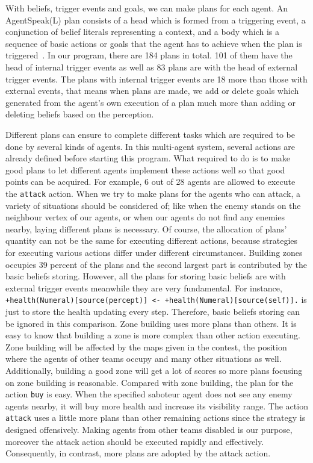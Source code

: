 With beliefs, trigger events and goals, we can make plans for each agent.
An AgentSpeak(L) plan consists of a head which is formed from a triggering event, a conjunction of belief literals representing a context, and a body which is a sequence of basic actions or goals that the agent has to achieve when the plan is triggered~\cite{rafael_BDIAgent_2005}.
In our program, there are 184 plans in total.
101 of them have the head of internal trigger events as well as 83 plans are with the head of external trigger events.
The plans with internal trigger events are 18 more than those with external events, that means when plans are made, we add or delete goals which generated from the agent's own execution of a plan much more than adding or deleting beliefs based on the perception.

Different plans can ensure to complete different tasks which are required to be done by several kinds of agents.
In this multi-agent system, several actions are already defined before starting this program.
What required to do is to make good plans to let different agents implement these actions well so that good points can be acquired.
For example, 6 out of 28 agents are allowed to execute the \texttt{attack} action.
When we try to make plans for the agents who can attack, a variety of situations should be considered of; like when the enemy stands on the neighbour vertex of our agents, or when our agents do not find any enemies nearby, laying different plans is necessary.
Of course, the allocation of plans' quantity can not be the same for executing different actions, because strategies for executing various actions differ under different circumstances.
Building zones occupies 39 percent of the plans and the second largest part is contributed by the basic beliefs storing.
However, all the plans for storing basic beliefs are with external trigger events meanwhile they are very fundamental.
For instance, \texttt{+health(Numeral)[source(percept)] <- +health(Numeral)[source(self)].} is just to store the health updating every step.
Therefore, basic beliefs storing can be ignored in this comparison.
Zone building uses more plans than others.
It is easy to know that building a zone is more complex than other action executing.
Zone building will be affected by the maps given in the contest, the position where the agents of other teams occupy and many other situations as well.
Additionally, building a good zone will get a lot of scores so more plans focusing on zone building is reasonable.
Compared with zone building, the plan for the action \texttt{buy} is easy.
When the specified saboteur agent does not see any enemy agents nearby, it will buy more health and increase its visibility range.
The action \texttt{attack} uses a little more plans than other remaining actions since the strategy is designed offensively.
Making agents from other teams disabled is our purpose, moreover the attack action should be executed rapidly and effectively.
Consequently, in contrast, more plans are adopted by the attack action.

